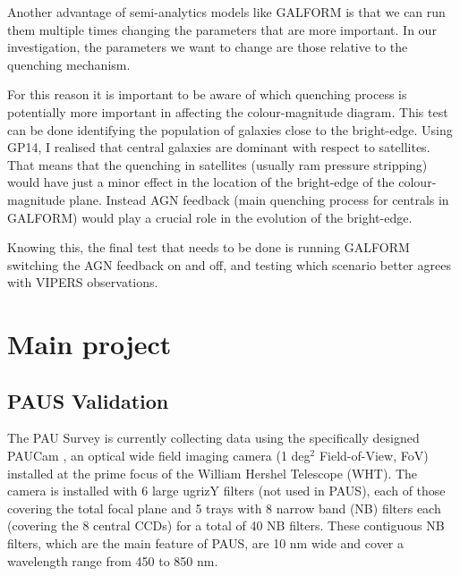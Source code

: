 \documentclass[11pt]{article}
\begin{document}
Another advantage of semi-analytics models like GALFORM is that we can run them multiple times changing the parameters that are more important. In our investigation, the parameters we want to change are those relative to the quenching mechanism.

For this reason it is important to be aware of which quenching process is potentially more important in affecting the colour-magnitude diagram. This test can be done identifying the population of galaxies close to the bright-edge.
 Using GP14, I realised that central galaxies are dominant with respect to satellites. That means that the quenching in satellites (usually ram pressure stripping) would have just a minor effect in the location of the bright-edge of the colour-magnitude plane. Instead AGN feedback (main quenching process for centrals in GALFORM) would play a crucial role in the evolution of the bright-edge. 

Knowing this, the final test that needs to be done is running GALFORM switching the AGN feedback on and off, and testing which scenario better agrees with VIPERS observations.


\section{Main project}
\label{sec:main}

\subsection{PAUS Validation} 
\label{sub:PAU_val}

The PAU Survey is currently collecting data using the specifically designed PAUCam \citep{castander12}, an optical wide field imaging camera (1 deg$^2$ Field-of-View, FoV) installed at the prime focus of the William Hershel Telescope (WHT).
The camera is installed with 6 large ugrizY filters (not used in PAUS), each of those covering the total focal plane and 5 trays with 8 narrow band (NB) filters each (covering the 8 central CCDs) for a total of 40 NB filters. These contiguous NB filters, which are the main feature of PAUS, are 10 nm wide and cover a wavelength range from 450 to 850 nm. \\
\end{document}
